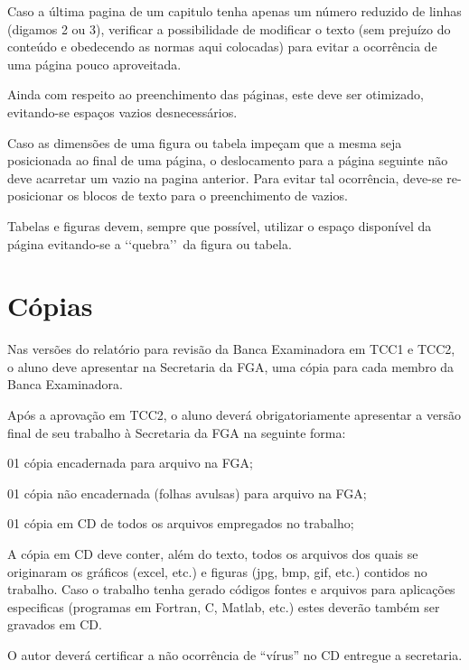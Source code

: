 Caso a última pagina de um capitulo tenha apenas um número reduzido de 
linhas (digamos 2 ou 3), verificar a possibilidade de modificar o texto 
(sem prejuízo do conteúdo e obedecendo as normas aqui colocadas) para 
evitar a ocorrência de uma página pouco aproveitada.

Ainda com respeito ao preenchimento das páginas, este deve ser otimizado, 
evitando-se espaços vazios desnecessários. 

Caso as dimensões de uma figura ou tabela impeçam que a mesma seja 
posicionada ao final de uma página, o deslocamento para a página seguinte 
não deve acarretar um vazio na pagina anterior. Para evitar tal ocorrência, 
deve-se re-posicionar os blocos de texto para o preenchimento de vazios. 

Tabelas e figuras devem, sempre que possível, utilizar o espaço disponível 
da página evitando-se a \lq\lq quebra\rq\rq\ da figura ou tabela. 

\section{Cópias}

Nas versões do relatório para revisão da Banca Examinadora em TCC1 e TCC2, 
o aluno deve apresentar na Secretaria da FGA, uma cópia para cada membro da 
Banca Examinadora.

Após a aprovação em TCC2, o aluno deverá obrigatoriamente apresentar a 
versão final de seu trabalho à Secretaria da FGA na seguinte forma:

\begin{description}
	\item 01 cópia encadernada para arquivo na FGA;
	\item 01 cópia não encadernada (folhas avulsas) para arquivo na FGA;
	\item 01 cópia em CD de todos os arquivos empregados no trabalho;
\end{description}

A cópia em CD deve conter, além do texto, todos os arquivos dos quais se 
originaram os gráficos (excel, etc.) e figuras (jpg, bmp, gif, etc.) 
contidos no trabalho. Caso o trabalho tenha gerado códigos fontes e 
arquivos para aplicações especificas (programas em Fortran, C, Matlab, 
etc.) estes deverão também ser gravados em CD. 

O autor deverá certificar a não ocorrência de “vírus” no CD entregue a 
secretaria. 

